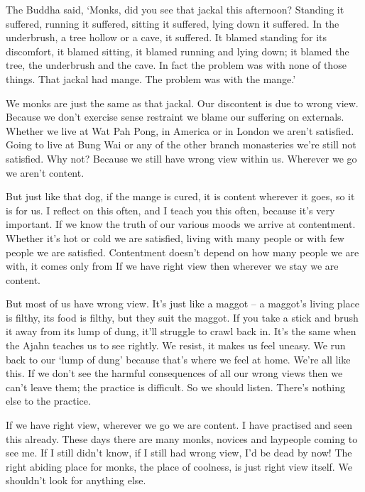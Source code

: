 The Buddha said, `Monks, did you see that jackal this afternoon? Standing it suffered, running it suffered, sitting it suffered, lying down it suffered. In the underbrush, a tree hollow or a cave, it suffered. It blamed standing for its discomfort, it blamed sitting, it blamed running and lying down; it blamed the tree, the underbrush and the cave. In fact the problem was with none of those things. That jackal had mange. The problem was with the mange.'

We monks are just the same as that jackal. Our discontent is due to wrong view. Because we don't exercise sense restraint we blame our suffering on externals. Whether we live at Wat Pah Pong, in America or in London we aren't satisfied. Going to live at Bung Wai or any of the other branch monasteries we're still not satisfied. Why not? Because we still have wrong view within us. Wherever we go we aren't content.

But just like that dog, if the mange is cured, it is content wherever it goes, so it is for us. I reflect on this often, and I teach you this often, because it's very important. If we know the truth of our various moods we arrive at contentment. Whether it's hot or cold we are satisfied, living with many people or with few people we are satisfied. Contentment doesn't depend on how many people we are with, it comes only from  If we have right view then wherever we stay we are content.

But most of us have wrong view. It's just like a maggot -- a maggot's living place is filthy, its food is filthy, but they suit the maggot. If you take a stick and brush it away from its lump of dung, it'll struggle to crawl back in. It's the same when the Ajahn teaches us to see rightly. We resist, it makes us feel uneasy. We run back to our `lump of dung' because that's where we feel at home. We're all like this. If we don't see the harmful consequences of all our wrong views then we can't leave them; the practice is difficult. So we should listen. There's nothing else to the practice.

If we have right view, wherever we go we are content. I have practised and seen this already. These days there are many monks, novices and laypeople coming to see me. If I still didn't know, if I still had wrong view, I'd be dead by now! The right abiding place for monks, the place of coolness, is just right view itself. We shouldn't look for anything else.

